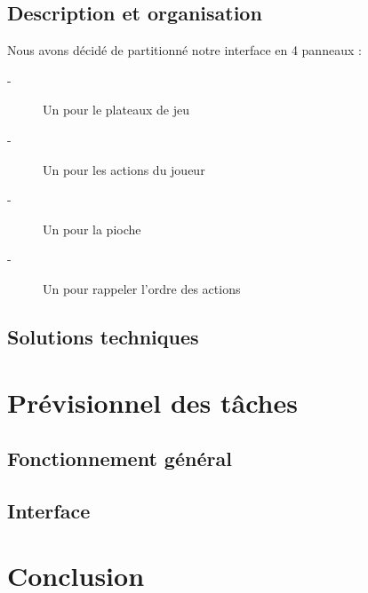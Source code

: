 \documentclass[11pt]{report}
\begin{document}
	\section{Description et organisation}
		Nous avons décidé de partitionné notre interface en 4 panneaux :
		\begin{description}
			\item[-]Un pour le plateaux de jeu
			\item[-]Un pour les actions du joueur
			\item[-]Un pour la pioche
			\item[-]Un pour rappeler l'ordre des actions
		\end{description}		 
	\section{Solutions techniques}

\chapter{Prévisionnel des tâches}

	\section{Fonctionnement général}

	\section{Interface}

\chapter{Conclusion}
\end{document}
